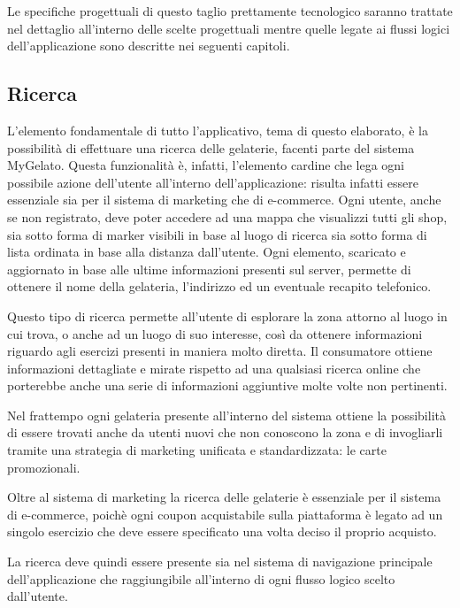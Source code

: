 Le specifiche progettuali di questo taglio prettamente tecnologico saranno trattate nel dettaglio all'interno delle scelte progettuali mentre quelle legate ai flussi logici dell'applicazione sono descritte nei seguenti capitoli.

\subsection{Ricerca}
L'elemento fondamentale di tutto l'applicativo, tema di questo elaborato, è la possibilità di effettuare una ricerca delle gelaterie, facenti parte del sistema MyGelato.
Questa funzionalità è, infatti, l'elemento cardine che lega ogni possibile azione dell'utente all'interno dell'applicazione: risulta infatti essere essenziale sia per il sistema di marketing che di e-commerce.
Ogni utente, anche se non registrato, deve poter accedere ad una mappa che visualizzi tutti gli shop, sia sotto forma di marker visibili in base al luogo di ricerca sia sotto forma di lista ordinata in base alla distanza dall'utente.
Ogni elemento, scaricato e aggiornato in base alle ultime informazioni presenti sul server, permette di ottenere il nome della gelateria, l'indirizzo ed un eventuale recapito telefonico.

Questo tipo di ricerca permette all'utente di esplorare la zona attorno al luogo in cui trova, o anche ad un luogo di suo interesse, così da ottenere informazioni riguardo agli esercizi presenti in maniera molto diretta.
Il consumatore ottiene informazioni dettagliate e mirate rispetto ad una qualsiasi ricerca online che porterebbe anche una serie di informazioni aggiuntive molte volte non pertinenti.

Nel frattempo ogni gelateria presente all'interno del sistema ottiene la possibilità di essere trovati anche da utenti nuovi che non conoscono la zona e di invogliarli tramite una strategia di marketing unificata e standardizzata: le carte promozionali.

Oltre al sistema di marketing la ricerca delle gelaterie è essenziale per il sistema di e-commerce, poichè ogni coupon acquistabile sulla piattaforma è legato ad un singolo esercizio che deve essere specificato una volta deciso il proprio acquisto.

La ricerca deve quindi essere presente sia nel sistema di navigazione principale dell'applicazione che raggiungibile all'interno di ogni flusso logico scelto dall'utente.

